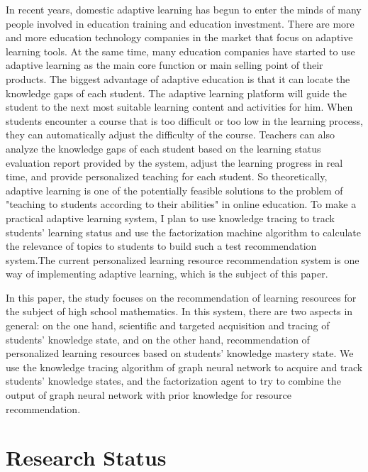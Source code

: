 In recent years, domestic adaptive learning has begun to enter the minds of many people involved in education training and education investment. There are more and more education technology companies in the market that focus on adaptive learning tools. At the same time, many education companies have started to use adaptive learning as the main core function or main selling point of their products. The biggest advantage of adaptive education is that it can locate the knowledge gaps of each student. The adaptive learning platform will guide the student to the next most suitable learning content and activities for him. When students encounter a course that is too difficult or too low in the learning process, they can automatically adjust the difficulty of the course. Teachers can also analyze the knowledge gaps of each student based on the learning status evaluation report provided by the system, adjust the learning progress in real time, and provide personalized teaching for each student. So theoretically, adaptive learning is one of the potentially feasible solutions to the problem of "teaching to students according to their abilities" in online education. To make a practical adaptive learning system, I plan to use knowledge tracing to track students' learning status and use the factorization machine algorithm to calculate the relevance of topics to students to build such a test recommendation system.The current personalized learning resource recommendation system is one way of implementing adaptive learning, which is the subject of this paper.

In this paper, the study focuses on the recommendation of learning resources for the subject of high school mathematics. In this system, there are two aspects in general: on the one hand, scientific and targeted acquisition and tracing of students' knowledge state, and on the other hand, recommendation of personalized learning resources based on students' knowledge mastery state. We use the knowledge tracing algorithm of graph neural network to acquire and track students' knowledge states, and the factorization agent to try to combine the output of graph neural network with prior knowledge for resource recommendation.


\section{Research Status} %


